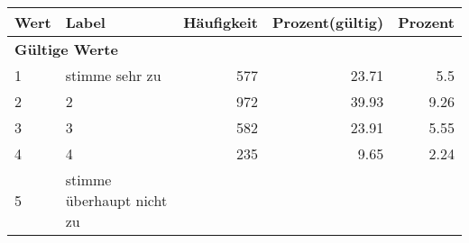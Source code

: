      \begin{longtable}{lXrrr}
     \toprule
     \textbf{Wert} & \textbf{Label} & \textbf{Häufigkeit} & \textbf{Prozent(gültig)} & \textbf{Prozent} \\
     \endhead
     \midrule
     \multicolumn{5}{l}{\textbf{Gültige Werte}}\\

     1 &
     \multicolumn{1}{X}{ stimme sehr zu   } &


       \num{577} &
       \num[round-mode=places,round-precision=2]{23.71} &
         \num[round-mode=places,round-precision=2]{5.5} \\

     2 &
     \multicolumn{1}{X}{ 2   } &


       \num{972} &
       \num[round-mode=places,round-precision=2]{39.93} &
         \num[round-mode=places,round-precision=2]{9.26} \\

     3 &
     \multicolumn{1}{X}{ 3   } &


       \num{582} &
       \num[round-mode=places,round-precision=2]{23.91} &
         \num[round-mode=places,round-precision=2]{5.55} \\

     4 &
     \multicolumn{1}{X}{ 4   } &


       \num{235} &
       \num[round-mode=places,round-precision=2]{9.65} &
         \num[round-mode=places,round-precision=2]{2.24} \\

     5 &
     \multicolumn{1}{X}{ stimme überhaupt nicht zu   } &



\end{longtable}
